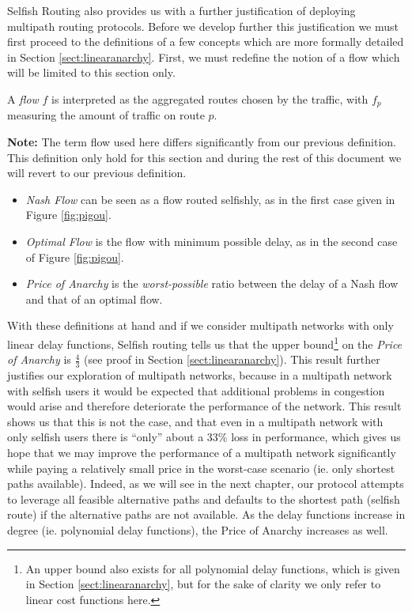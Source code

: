 
Selfish Routing also provides us with a further justification of deploying multipath routing protocols. Before we develop further this justification we must first proceed to the definitions of a few concepts which are more formally detailed in Section \ref{sect:linearanarchy}. First, we must redefine the notion of a flow which will be limited to this section only.

\begin{definition}
  A \emph{flow} $f$ is interpreted as the aggregated routes chosen by the traffic, with $f_p$ measuring the amount of traffic on route $p$.
\end{definition}

\textbf{Note:} The term flow used here differs significantly from our previous definition. This definition only hold for this section and during the rest of this document we will revert to our previous definition.

\begin{itemize}
 \item \emph{Nash Flow} can be seen as a flow routed selfishly, as in the first case given in Figure \ref{fig:pigou}.
 \item \emph{Optimal Flow} is the flow with minimum possible delay, as in the second case of Figure \ref{fig:pigou}.
 \item \emph{Price of Anarchy} is the \emph{worst-possible} ratio between the delay of a Nash flow and that of an optimal flow.
\end{itemize}

With these definitions at hand and if we consider multipath networks with only linear delay functions, Selfish routing tells us that the upper bound\footnote{An upper bound also exists for all polynomial delay functions, which is given in Section \ref{sect:linearanarchy}, but for the sake of clarity we only refer to linear cost functions here.} on the \emph{Price of Anarchy} is $\frac{4}{3}$ (see proof in Section \ref{sect:linearanarchy}). This result further justifies our exploration of multipath networks, because in a multipath network with selfish users it would be expected that additional problems in congestion would arise and therefore deteriorate the performance of the network. This result shows us that this is not the case, and that even in a multipath network with only selfish users there is ``only'' about a 33\% loss in performance, which gives us hope that we may improve the performance of a multipath network significantly while paying a relatively small price in the worst-case scenario (ie. only shortest paths available). Indeed, as we will see in the next chapter, our protocol attempts to leverage all feasible alternative paths and defaults to the shortest path (selfish route) if the alternative paths are not available. As the delay functions increase in degree (ie. polynomial delay functions), the Price of Anarchy increases as well.

